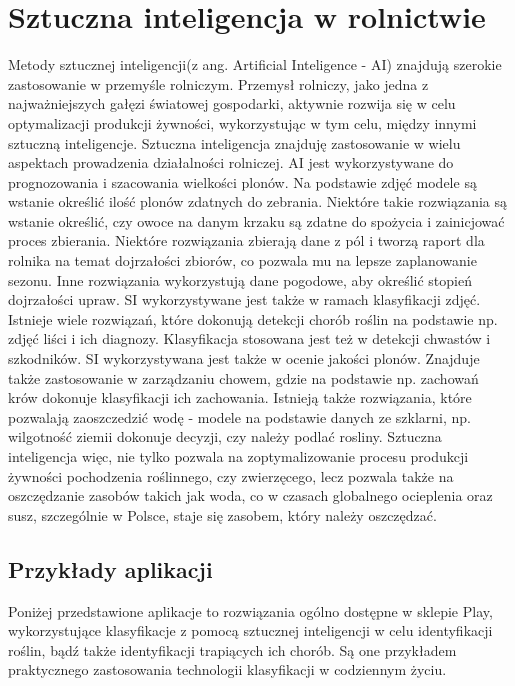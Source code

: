 \newpage
\section{Sztuczna inteligencja w rolnictwie}
Metody sztucznej inteligencji(z ang. Artificial Inteligence - AI) znajdują szerokie zastosowanie w przemyśle rolniczym. Przemysł rolniczy, jako jedna z najważniejszych gałęzi światowej gospodarki, aktywnie rozwija się w celu optymalizacji produkcji żywności, wykorzystując w tym celu, między innymi sztuczną inteligencje. Sztuczna inteligencja znajduję zastosowanie w wielu aspektach prowadzenia działalności rolniczej. AI jest wykorzystywane do prognozowania i szacowania wielkości plonów. Na podstawie zdjęć modele są wstanie określić ilość plonów zdatnych do zebrania. Niektóre takie rozwiązania są wstanie określić, czy owoce na danym krzaku są zdatne do spożycia i zainicjować proces zbierania. Niektóre rozwiązania zbierają dane z pól i tworzą raport dla rolnika na temat dojrzałości zbiorów, co pozwala mu na lepsze zaplanowanie sezonu. Inne rozwiązania wykorzystują dane pogodowe, aby określić stopień dojrzałości upraw. SI wykorzystywane jest także w ramach klasyfikacji zdjęć. Istnieje wiele rozwiązań, które dokonują detekcji chorób roślin na podstawie np. zdjęć liści i ich diagnozy. Klasyfikacja stosowana jest też w detekcji chwastów i szkodników. SI wykorzystywana jest także w ocenie jakości plonów. Znajduje także zastosowanie w zarządzaniu chowem, gdzie na podstawie np. zachowań krów dokonuje klasyfikacji ich zachowania. Istnieją także rozwiązania, które pozwalają zaoszczedzić wodę - modele na podstawie danych ze szklarni, np. wilgotność ziemii dokonuje decyzji, czy należy podlać rosliny. Sztuczna inteligencja więc, nie tylko pozwala na zoptymalizowanie procesu produkcji żywności pochodzenia roślinnego, czy zwierzęcego, lecz pozwala także na oszczędzanie zasobów takich jak woda, co w czasach globalnego ocieplenia oraz susz, szczególnie w Polsce, staje się zasobem, który należy oszczędzać. \cite{liakos2018mlagriculture}
\subsection{Przykłady aplikacji}
Poniżej przedstawione aplikacje to rozwiązania ogólno dostępne w sklepie Play, wykorzystujące klasyfikacje z pomocą sztucznej inteligencji w celu identyfikacji roślin, bądź także identyfikacji trapiących ich chorób. Są one przykładem praktycznego zastosowania technologii klasyfikacji w codziennym życiu.
